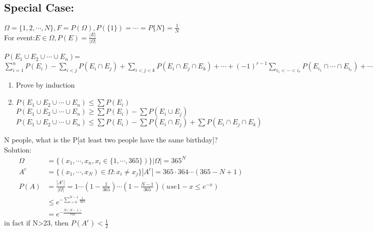  \subsection{Special Case:}
 $ \Omega=\{1,2,\cdots,N\}, F=P(\Omega),P(\{1\})=\cdots=P\{N\}=\frac{1}{N} $
 \\For event:$ E\in \Omega,P(E)=\frac{|E|}{|\Omega|} $
 \begin{definition}{}
 $P(E_1\cup E_2\cup\cdots\cup E_n)$= $ \sum_{i=1}^{n}P(E_i)-\sum_{i<j}P(E_i\cap E_j)+\sum_{i<j<k}P(E_i\cap E_j\cap E_k)+\cdots+(-1)^{r-1}\sum_{i_1<\cdots<i_r}P(E_{i_1}\cap\cdots\cap E_{i_r})+\cdots+(-1)^{n-1}P(E_1\cap E_2\cap\cdots\cap E_n)$
 \end{definition}  
 \begin{remark}[]{}
  \begin{enumerate}[label=\circled{\arabic*}] 
  \item Prove by induction
  \item $ P(E_1\cup E_2\cup\cdots\cup E_n)\leq \sum P(E_i) $ 
  \\$ P(E_1\cup E_2\cup\cdots\cup E_n)\geq \sum P(E_i)-\sum P(E_i\cup E_j) $
  \\ $ P(E_1\cup E_2\cup\cdots\cup E_n)\leq \sum P(E_i)-\sum P(E_i\cap E_j)+ \sum P(E_i\cap E_j\cap E_k)$
  \end{enumerate}
 \end{remark}
 \begin{example}{}
  N people, what is the P[at least two people have the same birthday]?
  \\Solution:
    \begin{align*}{}{}
        \Omega&=\{(x_1,\cdots,x_n,x_i\in\{1,\cdots,365\})\} |\Omega|=365^N \\
        A^c&=\{(x_1,\cdots,x_N)\in \Omega:x_i\neq x_j\} |A^c|=365\cdot 364\cdots(365-N+1)\\
        P(A)&=\frac{|A^c|}{|\Omega|}=1\cdots(1-\frac{1}{365})\cdots(1-\frac{N-1}{365})(use 1-x \leq e^{-x})\\
        &\leq e^{-\sum_{i=0}^{N-1}\frac{i}{365}}\\
        &=e^{-\frac{N(N-1)}{730}}
    \end{align*}
    in fact if N>23, then $P(A^c)<\frac{1}{2}$
 \end{example}
